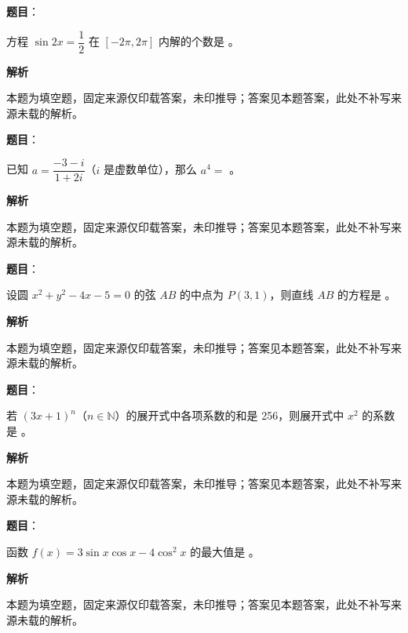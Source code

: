 \begin{answer}

\textbf{题目}：

方程 $\sin 2x=\dfrac12$ 在 $[-2\pi,2\pi]$ 内解的个数是 \gkblank{}。

\textbf{解析}

本题为填空题，固定来源仅印载答案，未印推导；答案见本题答案，此处不补写来源未载的解析。


\end{answer}
\begin{answer}

\textbf{题目}：

已知 $a=\dfrac{-3-i}{1+2i}$（$i$ 是虚数单位），那么 $a^4=$ \gkblank{}。

\textbf{解析}

本题为填空题，固定来源仅印载答案，未印推导；答案见本题答案，此处不补写来源未载的解析。


\end{answer}
\begin{answer}

\textbf{题目}：

设圆 $x^2+y^2-4x-5=0$ 的弦 $AB$ 的中点为 $P(3,1)$，则直线 $AB$ 的方程是 \gkblank{}。

\textbf{解析}

本题为填空题，固定来源仅印载答案，未印推导；答案见本题答案，此处不补写来源未载的解析。


\end{answer}
\begin{answer}

\textbf{题目}：

若 $(3x+1)^n$（$n\in\mathbb N$）的展开式中各项系数的和是 256，则展开式中 $x^2$ 的系数是 \gkblank{}。

\textbf{解析}

本题为填空题，固定来源仅印载答案，未印推导；答案见本题答案，此处不补写来源未载的解析。


\end{answer}
\begin{answer}

\textbf{题目}：

函数 $f(x)=3\sin x\cos x-4\cos^2x$ 的最大值是 \gkblank{}。

\textbf{解析}

本题为填空题，固定来源仅印载答案，未印推导；答案见本题答案，此处不补写来源未载的解析。


\end{answer}
